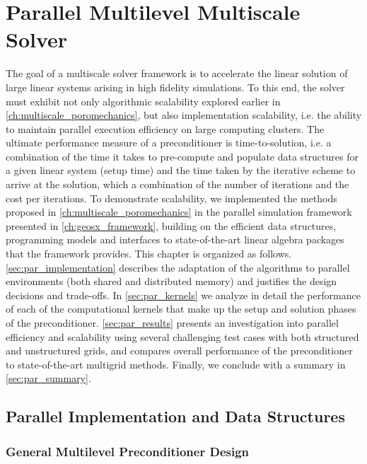 \chapter{Parallel Multilevel Multiscale Solver}
\label{ch:parallel_multiscale}

The goal of a multiscale solver framework is to accelerate the linear solution of large linear systems arising in high fidelity simulations.   To this end, the solver must exhibit not only algorithmic scalability explored earlier in \autoref{ch:multiscale_poromechanics}, but also implementation scalability, i.e. the ability to maintain parallel execution efficiency on large computing clusters.   The ultimate performance measure of a preconditioner is time-to-solution, i.e. a combination of the time it takes to pre-compute and populate data structures for a given linear system (setup time) and the time taken by the iterative scheme to arrive at the solution, which a combination of the number of iterations and the cost per iterations.   To demonstrate scalability, we implemented the methods proposed in \autoref{ch:multiscale_poromechanics} in the parallel simulation framework presented in \autoref{ch:geosx_framework}, building on the efficient data structures, programming models and interfaces to state-of-the-art linear algebra packages that the framework provides.   This chapter is organized as follows. \autoref{sec:par_implementation} describes the adaptation of the algorithms to parallel environments (both shared and distributed memory) and justifies the design decisions and trade-offs.   In \autoref{sec:par_kernels} we analyze in detail the performance of each of the computational kernels that make up the setup and solution phases of the preconditioner.   \autoref{sec:par_results} presents an investigation into parallel efficiency and scalability using several challenging test cases with both structured and unstructured grids, and compares overall performance of the preconditioner to state-of-the-art multigrid methods.    Finally, we conclude with a summary in \autoref{sec:par_summary}.

\section{Parallel Implementation and Data Structures}
\label{sec:par_implementation}

\subsection{General Multilevel Preconditioner Design}
\label{subsec:par_impl_prec_design}

